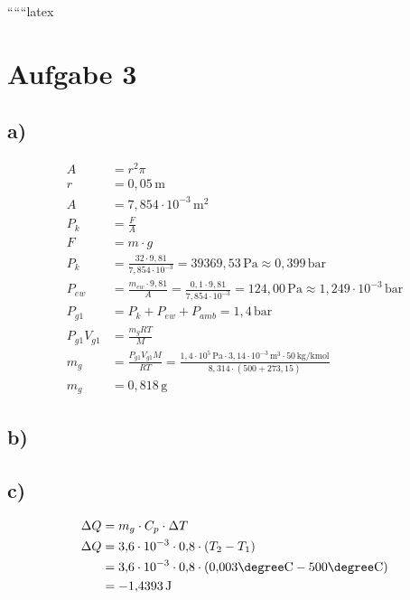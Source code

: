 
``````latex


\section*{Aufgabe 3}

\subsection*{a)}
\begin{align*}
    A &= r^2 \pi \\
    r &= 0{,}05 \, \text{m} \\
    A &= 7{,}854 \cdot 10^{-3} \, \text{m}^2 \\
    P_{k} &= \frac{F}{A} \\
    F &= m \cdot g \\
    P_{k} &= \frac{32 \cdot 9{,}81}{7{,}854 \cdot 10^{-3}} = 39369{,}53 \, \text{Pa} \approx 0{,}399 \, \text{bar} \\
    P_{ew} &= \frac{m_{ew} \cdot 9{,}81}{A} = \frac{0{,}1 \cdot 9{,}81}{7{,}854 \cdot 10^{-3}} = 124{,}00 \, \text{Pa} \approx 1{,}249 \cdot 10^{-3} \, \text{bar} \\
    P_{g1} &= P_{k} + P_{ew} + P_{amb} = 1{,}4 \, \text{bar} \\
    P_{g1} V_{g1} &= \frac{m_{g} R T}{M} \\
    m_{g} &= \frac{P_{g1} V_{g1} M}{R T} = \frac{1{,}4 \cdot 10^5 \, \text{Pa} \cdot 3{,}14 \cdot 10^{-3} \, \text{m}^3 \cdot 50 \, \text{kg/kmol}}{8{,}314 \cdot (500 + 273{,}15)} \\
    m_{g} &= 0{,}818 \, \text{g}
\end{align*}

\subsection*{b)}

\subsection*{c)}
\begin{align*}
    \Delta Q &= m_{g} \cdot C_p \cdot \Delta T \\
    \Delta Q &= 3{,}6 \cdot 10^{-3} \cdot 0{,}8 \cdot (T_2 - T_1) \\
    &= 3{,}6 \cdot 10^{-3} \cdot 0{,}8 \cdot (0{,}003 \degree \text{C} - 500 \degree \text{C}) \\
    &= -1{,}4393 \, \text{J}
\end{align*}


